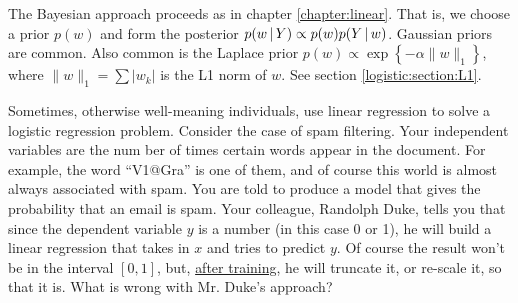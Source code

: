 The Bayesian approach proceeds as in chapter \ref{chapter:linear}.  That is, we choose a prior $p(w)$ and form the posterior $p(w{\,|\,} Y)\propto p(w)p(Y{\,|\,} w)$.  Gaussian priors are common.  Also common is the Laplace prior $p(w)\propto \exp\left\{ -\alpha\|w\|_1 \right\}$, where $\|w\|_1 = \sum |w_k|$ is the L1 norm of $w$.  See section \ref{logistic:section:L1}.

\begin{exercise}
  Sometimes, otherwise well-meaning individuals, use linear regression to solve a logistic regression problem.  Consider the case of spam filtering.  Your independent variables are the num ber of times certain words appear in the document.  For example, the word ``V1@Gra'' is one of them, and of course this world is almost always associated with spam.  You are told to produce a model that gives the probability that an email is spam.  Your colleague, Randolph Duke, tells you that since the dependent variable $y$ is a number (in this case 0 or 1), he will build a linear regression that takes in $x$ and tries to predict $y$.  Of course the result won't be in the interval $[0, 1]$, but, \underline{after training}, he will truncate it, or re-scale it, so that it is.  What is wrong with Mr. Duke's approach?
\end{exercise}


